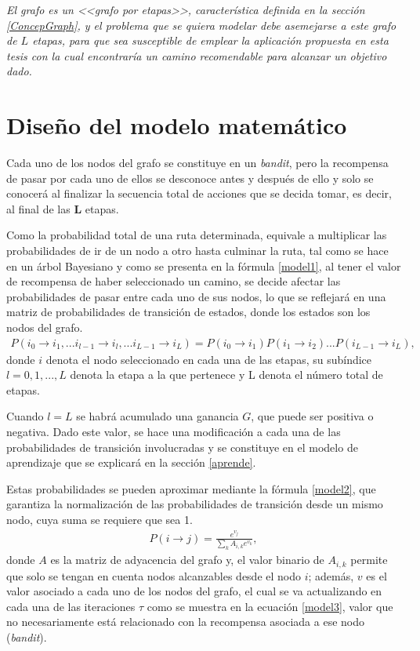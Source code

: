 \textit{El grafo es un <<grafo por etapas>>, característica definida en la sección \ref{ConcepGraph}, y el problema que se quiera modelar debe asemejarse a este grafo de $L$ etapas, para que sea susceptible de emplear la aplicación propuesta en esta tesis con la cual encontraría un camino recomendable para alcanzar un objetivo dado.}

\section{Diseño del modelo matemático}
\label{mat}
Cada uno de los nodos del grafo se constituye en un \textit{ bandit}, pero la recompensa de pasar por cada uno de ellos se desconoce antes y después de ello y solo se conocerá al finalizar la secuencia total de acciones que se decida tomar, es decir, al final de las \textbf{L} etapas.

Como la probabilidad total de una ruta determinada, equivale a multiplicar las probabilidades de ir de un nodo a otro hasta culminar la ruta, tal como se hace en un árbol Bayesiano y como se presenta en la fórmula \ref{model1}, al tener el valor de recompensa de haber seleccionado un camino, se decide afectar las probabilidades de pasar entre cada uno de sus nodos, lo que se reflejará en una matriz de probabilidades de transición de estados, donde los estados son los nodos del grafo.
\begin{eqnarray}\label{model1}
P(i_{0} \to i_{1}, ... i_{l-1} \to i_{l}, ... i_{L-1} \to i_{L})=P(i_{0} \to i_{1})P(i_{1} \to i_{2})...P(i_{L-1} \to i_{L}),
\end{eqnarray}
donde $i$ denota el nodo seleccionado en cada una de las etapas, su subíndice $l=0,1,...,L$ denota la etapa a la que pertenece y L denota el número total de etapas. 

Cuando $l = L$ se habrá acumulado una ganancia $G$, que puede ser positiva o negativa. Dado este valor, se hace una modificación a cada una de las probabilidades de transición involucradas y se constituye en el modelo de aprendizaje que se explicará en la sección \ref{aprende}.

Estas probabilidades se pueden aproximar mediante la fórmula \ref{model2}, que garantiza la normalización de las probabilidades de transición desde un mismo nodo, cuya suma se requiere que sea 1.
\begin{eqnarray}\label{model2}
P(i \to j) = \frac{e^{v_j}}{\sum_k A_{i,k} e^{v_k}},
\end{eqnarray}
donde $A$ es la matriz de adyacencia del grafo y, el valor binario de $A_{i,k}$ permite que solo se tengan en cuenta nodos alcanzables desde el nodo $i$; además, $v$ es el valor asociado a cada uno de los nodos del grafo, el cual se va actualizando en cada una de las iteraciones $\tau$ como se muestra en la ecuación \ref{model3}, valor que no necesariamente está relacionado con la recompensa asociada a ese nodo (\textit{bandit}).

